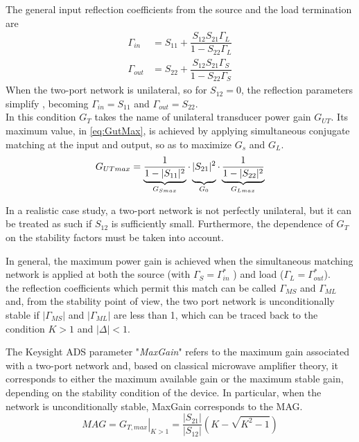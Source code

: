 The general input reflection coefficients from the source and the load termination \cite{Microwave Transistor Amplifiers Analysis and Design}\cite{Pozar2012} are 
\begin{align}
    \Gamma_{in}&=S_{11}+\dfrac{S_{12}S_{21}\Gamma_L}{1-S_{22}\Gamma_L}\\
    \Gamma_{out}&=S_{22}+\dfrac{S_{12}S_{21}\Gamma_S}{1-S_{22}\Gamma_S}
\end{align}
When the two-port network is unilateral, so for $S_{12}=0$, the reflection parameters simplify , becoming 
$\Gamma_{in}=S_{11}$ and $\Gamma_{out}=S_{22}$.\\
In this condition $G_T$ takes the name of unilateral transducer power gain $G_{UT}$. Its maximum value, in \eqref{eq:GutMax}, is achieved by applying simultaneous conjugate matching at the input and output, so as to maximize $G_s$ and $G_L$. 
\begin{equation}
G_{UTmax}=
\underbrace{\vphantom{\dfrac{1}{1-|S_{11}|^2}}\dfrac{1}{1-|S_{11}|^2}}_{G_{Smax}}
\cdot
\underbrace{\vphantom{\dfrac{1}{1-|S_{11}|^2}}|S_{21}|^2}_{G_0}
\cdot
\underbrace{\vphantom{\dfrac{1}{1-|S_{11}|^2}}\dfrac{1}{1-|S_{22}|^2}}_{G_{Lmax}}
\label{eq:GutMax}
\end{equation}

In a realistic case study, a two-port network is not perfectly unilateral, but it can be treated as such if $S_{12}$ is sufficiently small. Furthermore, the dependence of $G_T$ on the stability factors must be taken into account.

In general, the maximum power gain is achieved when the simultaneous matching network is applied at both the source (with $\Gamma_S=\Gamma_{in}^*$ ) and load ($\Gamma_L=\Gamma_{out}^*$).\\
the reflection coefficients which permit this match can be called $\Gamma_{MS}$ and $\Gamma_{ML}$ and, from the stability point of view, the two port network is unconditionally stable if $|\Gamma_{MS}|$ and $|\Gamma_{ML}|$ are less than 1, which can be traced back to the condition $K>1$ and $|\Delta|<1$.

The Keysight ADS parameter "\textit{MaxGain}" \cite{Keysight Knowledge Center} refers to the maximum gain associated with a two-port network and, based on classical microwave amplifier theory\cite{Microwave Transistor Amplifiers Analysis and Design}\cite{Pozar2012}, it corresponds to either the maximum available gain or the maximum stable gain, depending on the stability condition of the device.
In particular, when the network is unconditionally stable, MaxGain corresponds to the MAG.
\begin{equation}
    MAG=\left.G_{T,max}\right|_{K>1}=\dfrac{|S_{21}|}{|S_{12}|}(K-\sqrt{K^2-1}) 
    \label{eq:MAG}
\end{equation}

